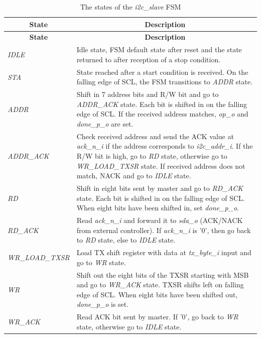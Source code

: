 \documentclass[a4paper,11pt]{article}
\begin{document}
\begin{longtable}{l p{}}
  \caption{The states of the \textit{i2c\_slave} FSM}
  \label{tbl:fsm} \\

    \hline
    \multicolumn{1}{c}{\textbf{State}} & \multicolumn{1}{c}{\textbf{Description}} \\
    \hline
    \endfirsthead
    
    \hline
    \multicolumn{1}{c}{\textbf{State}} & \multicolumn{1}{c}{\textbf{Description}} \\
    \hline
    \endhead
    
    \hline
    \endfoot
    
    \textit{IDLE} & Idle state, FSM default state after reset and the state returned to after
                    reception of a stop condition. \\
    \textit{STA}  & State reached after a start condition is received. On the falling edge
                    of SCL, the FSM transitions to \textit{ADDR} state. \\
    \textit{ADDR} & Shift in 7 address bits and R/W bit and go to \textit{ADDR\_ACK}
                    state. Each bit is shifted in on the falling edge of SCL. If the
                    received address matches, \textit{op\_o} and \textit{done\_p\_o} are set. \\
    \textit{ADDR\_ACK} & Check received address and send the ACK value at \textit{ack\_n\_i} if
                         the address corresponds to \textit{i2c\_addr\_i}. If the R/W bit is high,
                         go to \textit{RD} state, otherwise go to \textit{WR\_LOAD\_TXSR} state.
                         If received address does not match, NACK and go to \textit{IDLE}
                         state. \\
   \textit{RD} & Shift in eight bits sent by master and go to \textit{RD\_ACK} state. Each bit 
                 is shifted in on the falling edge of SCL. When eight bits have been shifted in, 
                 set \textit{done\_p\_o}. \\
    \textit{RD\_ACK} & Read \textit{ack\_n\_i} and forward it to \textit{sda\_o} (ACK/NACK
                       from external controller). If \textit{ack\_n\_i} is '0', then go back to
                       \textit{RD} state, else to \textit{IDLE} state. \\
    \textit{WR\_LOAD\_TXSR} & Load TX shift register with data at \textit{tx\_byte\_i} input 
                              and go to \textit{WR} state. \\
    \textit{WR} & Shift out the eight bits of the TXSR starting with MSB and go to 
                  \textit{WR\_ACK} state. TXSR shifts left on falling edge of SCL. When
                  eight bits have been shifted out, \textit{done\_p\_o} is set.\\
    \textit{WR\_ACK} & Read ACK bit sent by master. If '0', go back to \textit{WR} state, otherwise
                       go to \textit{IDLE} state. \\
\end{longtable}
\end{document}
